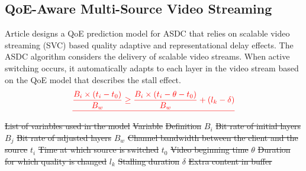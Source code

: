\documentclass[conference]{IEEEtran}
\providecommand{\DIFdel}[1]{{\protect\color{red}\sout{#1}}}                      %
\providecommand{\DIFdelbegin}{} %
\providecommand{\DIFdelend}{} %
\providecommand{\DIFdelFL}[1]{\DIFdel{#1}} %
\newcommand{\DIFscaledelfig}{0.5}
\newlength{\DIFdelgraphicswidth} %
\newlength{\DIFdelgraphicsheight} %
\newcommand{\DIFdelincludegraphics}[2][]{%
\sbox{\DIFdelgraphicsbox}{\DIFOincludegraphics[#1]{#2}}%
\settoboxwidth{\DIFdelgraphicswidth}{\DIFdelgraphicsbox} %
\settoboxtotalheight{\DIFdelgraphicsheight}{\DIFdelgraphicsbox} %
\scalebox{\DIFscaledelfig}{%
\parbox[b]{\DIFdelgraphicswidth}{\usebox{\DIFdelgraphicsbox}\\[-\baselineskip] \rule{\DIFdelgraphicswidth}{0em}}\llap{\resizebox{\DIFdelgraphicswidth}{\DIFdelgraphicsheight}{%
\setlength{\unitlength}{\DIFdelgraphicswidth}%
\begin{picture}(1,1)%
\thicklines\linethickness{2pt} %
{\color[rgb]{1,0,0}\put(0,0){\framebox(1,1){}}}%
{\color[rgb]{1,0,0}\put(0,0){\line( 1,1){1}}}%
{\color[rgb]{1,0,0}\put(0,1){\line(1,-1){1}}}%
\end{picture}%
}\hspace*{3pt}}} %
} %
\DeclareRobustCommand{\DIFdelbegin}{\DIFOdelbegin \let\includegraphics\DIFdelincludegraphics} %
\DeclareRobustCommand{\DIFdelend}{\DIFOaddend \let\includegraphics\DIFOincludegraphics} %
\begin{document}
\subsection{QoE-Aware Multi-Source Video Streaming}
Article \cite{b3} designs a QoE prediction model for ASDC that relies on scalable video streaming (SVC) based quality adaptive and representational delay effects. The ASDC algorithm considers the delivery of scalable video streams. When active switching occurs, it automatically adapts to each layer in the video stream based on the QoE model that describes the stall effect.
\DIFdelbegin \begin{displaymath}\DIFdel{%
\frac{B_{i}\times\left (t_{i}- t_{0}\right)}{B_{w}} \ge \frac{B_{i}\times\left (t_{i}- \theta- t_{0}\right )}{B_{w}}+ \left (l_{k}- \delta\right ) 
}\end{displaymath}%
{%
\DIFdelFL{List of variables used in the model}}
\DIFdelFL{Variable }%
\DIFdelFL{Definition }%
\DIFdelFL{$B_{i}$  }%
\DIFdelFL{Bit rate of initial layers}%
\DIFdelFL{$B_{j}$  }%
\DIFdelFL{Bit rate of adjusted layers}%
\DIFdelFL{$B_{w}$  }%
\DIFdelFL{Channel bandwidth between the client and the source}%
\DIFdelFL{$t_{i}$  }%
\DIFdelFL{Time at which source is switched}%
\DIFdelFL{$t_{0}$  }%
\DIFdelFL{Video beginning time}%
\DIFdelFL{$\theta$  }%
\DIFdelFL{Duration for which quality is changed}%
\DIFdelFL{$l_{k}$  }%
\DIFdelFL{Stalling duration}%
\DIFdelFL{$\delta$ }%
\DIFdelFL{Extra content in buffer}%
\DIFdelend 
\end{document}

